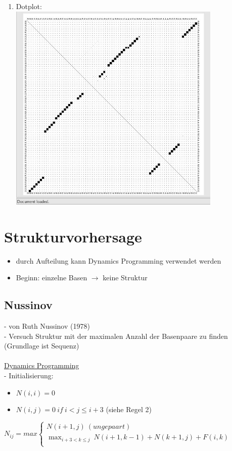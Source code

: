 \documentclass[12pt,a4paper]{article}
\begin{document}
\begin{enumerate}
	\item Dotplot:\\
	\includegraphics[width=0.8\textwidth]{lectures/160404/pix/Dotplot.jpg}
\end{enumerate}

\section{Strukturvorhersage}
\begin{itemize}
	\item durch Aufteilung kann Dynamics Programming verwendet werden
	\item Beginn: einzelne Basen $\rightarrow$ keine Struktur
\end{itemize}

\subsection{Nussinov}
 - von Ruth Nussinov (1978)\\
 - Versuch Struktur mit der maximalen Anzahl der Basenpaare zu finden (Grundlage ist Sequenz)
\\\\
\underline{Dynamics Programming}\\
 - Initialisierung:
\begin{itemize}
	\item $N(i,i) = 0$
	\item $N(i,j)=0\ if\ i<j\le i+3$ (siehe Regel 2)
\end{itemize}

$N_{ij}=max \begin{cases}
               N(i+1, j)\ (ungepaart)\\
               \displaystyle\max_{i+3<k \le j}\ N(i+1, k-1) + N(k+1, j) + F(i,k)\\
\end{cases}$
\end{document}
